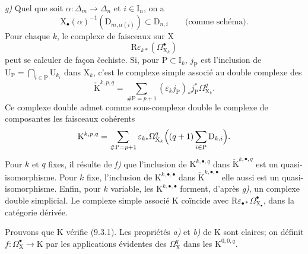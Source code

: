 \documentclass[11pt,leqno]{article}
\begin{document}
\textit{g)} Quel que soit \(\alpha:\Delta_{m}\to\Delta_{n}\) et \(i\in\mathrm{I}_{n}\), on a
\[
\mathrm{X}_{\bullet}(\alpha)^{-1}(\mathrm{D}_{m,\alpha(i)})
\subset\mathrm{D}_{n,i}
\qquad\text{(comme schéma).}
\]
Pour chaque \(k\), le complexe de faisceaux sur \(\mathrm{X}\)
\[
\mathrm{R}\varepsilon_{k*}(\Omega_{\mathrm{X}_{k}}^{\bullet})
\]
peut se calculer de façon čechiste. Si, pour \(\mathrm{P}\subset\mathrm{I}_{k}\), \(j_{\mathrm{P}}\) est l’inclusion de \(\mathrm{U}_{\mathrm{P}}=\bigcap_{i\in\mathrm{P}}\mathrm{U}_{k_i}\) dans \(\mathrm{X}_{k}\), c’est le complexe simple associé au double complexe des
\[
\check{\mathrm{K}}^{k,p,q}
=\sum_{\#\mathrm{P}=p+1}
(\varepsilon_{k}j_{\mathrm{P}})_{*}j_{\mathrm{P}}^{*}\Omega_{\mathrm{X}_{k}}^{q}.
\]
Ce complexe double admet comme sous-complexe double le complexe de composantes les faisceaux cohérents
\[
\mathrm{K}^{k,p,q}
=\sum_{\#\mathrm{P}=p+1}
\varepsilon_{k*}\Omega_{\mathrm{X}_{k}}^{q}
\Bigl((q+1)\sum_{i\in\mathrm{P}}\mathrm{D}_{k,i}\Bigr).
\]
Pour \(k\) et \(q\) fixes, il résulte de \textit{f)} que l’inclusion de \(\mathrm{K}^{k,\bullet,q}\) dans \(\check{\mathrm{K}}^{k,\bullet,q}\) est un quasi-isomorphisme. Pour \(k\) fixe, l’inclusion de \(\mathrm{K}^{k,\bullet,\bullet}\) dans \(\check{\mathrm{K}}^{k,\bullet,\bullet}\) elle aussi est un quasi-isomorphisme. Enfin, pour \(k\) variable, les \(\mathrm{K}^{k,\bullet,\bullet}\) forment, d’après \textit{g)}, un complexe double simplicial. Le complexe simple associé \(\mathrm{K}\) coïncide avec \(\mathrm{R}\varepsilon_{\bullet *}\Omega_{\mathrm{X}_{\bullet}}^{\bullet}\), dans la catégorie dérivée.

Prouvons que \(\mathrm{K}\) vérifie (9.3.1). Les propriétés \textit{a)} et \textit{b)} de \(\mathrm{K}\) sont claires; on définit \(f:\Omega_{\mathrm{X}}^{\bullet}\to\mathrm{K}\) par les applications évidentes des \(\Omega_{\mathrm{X}}^{q}\) dans les \(\mathrm{K}^{0,0,q}\).
\end{document}

